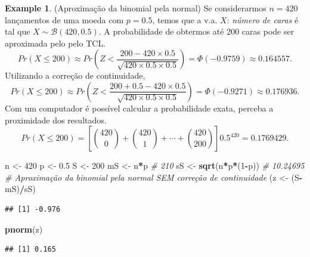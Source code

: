 \documentclass[
]{book}
\newenvironment{Shaded}{\begin{snugshade}}{\end{snugshade}}
\newcommand{\CommentTok}[1]{\textcolor[rgb]{0.56,0.35,0.01}{\textit{#1}}}
\newcommand{\DecValTok}[1]{\textcolor[rgb]{0.00,0.00,0.81}{#1}}
\newcommand{\FloatTok}[1]{\textcolor[rgb]{0.00,0.00,0.81}{#1}}
\newcommand{\KeywordTok}[1]{\textcolor[rgb]{0.13,0.29,0.53}{\textbf{#1}}}
\newcommand{\NormalTok}[1]{#1}
\newcommand{\OperatorTok}[1]{\textcolor[rgb]{0.81,0.36,0.00}{\textbf{#1}}}
\newcommand{\StringTok}[1]{\textcolor[rgb]{0.31,0.60,0.02}{#1}}
\theoremstyle{definition}
\theoremstyle{definition}
\newtheorem{example}{Example}[chapter]
\theoremstyle{definition}
\theoremstyle{remark}
\begin{document}
\begin{example}
\protect\hypertarget{exm:unnamed-chunk-70}{}{\label{exm:unnamed-chunk-70} }(Aproximação da binomial pela normal) Se considerarmos \(n=420\) lançamentos de uma moeda com \(p=0.5\), temos que a v.a. \(X\): \emph{número de caras} é tal que \(X \sim \mathcal{B}(420,0.5)\). A probabilidade de obtermos até 200 caras pode ser aproximada pelo pelo TCL. \[ Pr(X \le 200) \approx  Pr \left( Z < \dfrac{200-420\times 0.5}{\sqrt{420 \times 0.5 \times 0.5}} \right) = \Phi(-0.9759) \approx 0.164557. \]
Utilizando a correção de continuidade, \[ Pr(X \le 200) \approx  Pr \left( Z < \dfrac{200+0.5-420\times 0.5}{\sqrt{420 \times 0.5 \times 0.5}} \right) = \Phi(-0.9271) \approx 0.176936. \]
Com um computador é possível calcular a probabilidade exata, perceba a proximidade dos resultados. \[ Pr(X \le 200) = \left[ {420 \choose 0} + {420 \choose 1} + \cdots + {420 \choose 200} \right] 0.5^{420} = 0.1769429. \]
\end{example}

\begin{Shaded}
\begin{Highlighting}[]
\NormalTok{n \textless{}{-}}\StringTok{ }\DecValTok{420}
\NormalTok{p \textless{}{-}}\StringTok{ }\FloatTok{0.5}
\NormalTok{S \textless{}{-}}\StringTok{ }\DecValTok{200}
\NormalTok{mS \textless{}{-}}\StringTok{ }\NormalTok{n}\OperatorTok{*}\NormalTok{p  }\CommentTok{\# 210}
\NormalTok{sS \textless{}{-}}\StringTok{ }\KeywordTok{sqrt}\NormalTok{(n}\OperatorTok{*}\NormalTok{p}\OperatorTok{*}\NormalTok{(}\DecValTok{1}\OperatorTok{{-}}\NormalTok{p))  }\CommentTok{\# 10.24695}
\CommentTok{\# Aproximação da binomial pela normal SEM correção de continuidade}
\NormalTok{(z \textless{}{-}}\StringTok{ }\NormalTok{(S}\OperatorTok{{-}}\NormalTok{mS)}\OperatorTok{/}\NormalTok{sS)}
\end{Highlighting}
\end{Shaded}

\begin{verbatim}
## [1] -0.976
\end{verbatim}

\begin{Shaded}
\begin{Highlighting}[]
\KeywordTok{pnorm}\NormalTok{(z)}
\end{Highlighting}
\end{Shaded}

\begin{verbatim}
## [1] 0.165
\end{verbatim}
\end{document}
